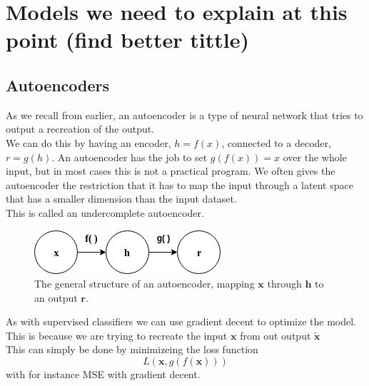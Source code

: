 	
\section{Models we need to explain at this point (find better tittle)}
    \subsection{Autoencoders}\label{Explaining_autoencoders}
	  As we recall from earlier, an autoencoder is a type of neural network that tries to output a recreation of the output. \\ 
	  
	  We can do this by having an encoder, $h=f(x)$, connected to a decoder, $r=g(h)$. 
	  An autoencoder has the job to set $g(f(x))=x$ over the whole input, but in most cases this is not a practical program. We often gives the autoencoder the restriction
	  that it has to map the input through a latent space that has a smaller dimension than the input dataset.\\
	  This is called an undercomplete autoencoder.\\
	  \vspace{10px}
	  \begin{figure}[ht!]
	    \centering
	    \includegraphics[scale=0.5]{background/figures/SimpleAE.png}
	    \caption{The general structure of an autoencoder, mapping $\textbf{x}$ through $\textbf{h}$ to an output $\textbf{r}$.}
	  \end{figure}
	  
	  As with supervised classifiers we can use gradient decent to optimize the model. This is because we are trying to recreate the input $\textbf{x}$ from out output $\widetilde{\textbf{x}}$\\
	  
	  This can simply be done by minimizeing the loss function\\
	  \begin{equation}
	    L(\textbf{x},g(f(\textbf{x})))
	  \end{equation}
	  with for instance MSE with gradient decent. \\
	  
